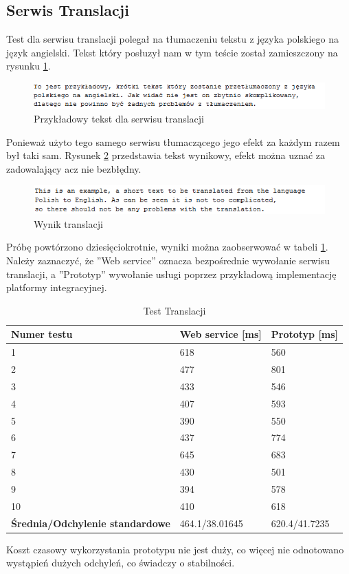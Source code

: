\subsection{Serwis Translacji}
Test dla serwisu translacji polegał na tłumaczeniu tekstu z języka polskiego na język angielski. Tekst który posłuzył nam w tym teście został zamieszczony na rysunku \ref{fig:translatorExample}.
\begin{figure}[!h]
\centering
\includegraphics[scale=0.9]{translatorExample.png}
\caption{Przykładowy tekst dla serwisu translacji}\label{fig:translatorExample}
\end{figure}
Ponieważ użyto tego samego serwisu tłumaczącego jego efekt za każdym razem był taki sam. Rysunek \ref{fig:translatorResult} przedstawia tekst wynikowy, efekt można uznać za zadowalający acz nie bezbłędny. 
\begin{figure}[!h]
\centering
\includegraphics[scale=0.9]{translatorResult.png}
\caption{Wynik translacji}\label{fig:translatorResult}
\end{figure}

Próbę powtórzono dziesięciokrotnie, wyniki można zaobserwować w tabeli \ref{tab:translacja}. Należy zaznaczyć, że ''Web service'' oznacza bezpośrednie wywołanie serwisu translacji, a ''Prototyp'' wywołanie usługi poprzez przykładową implementację platformy integracyjnej.
\begin{center}
	\begin{table}[h]
	\label{tab:translacja}
	\caption{Test Translacji}
	\centering
	\begin{tabular}{| l | l | l |}	
		\hline
		\textbf{Numer testu} & \textbf{Web service [ms]} & \textbf{Prototyp [ms]} \\ \hline
		1 & 618 & 560\\ \hline
		2 & 477 & 801\\ \hline
		3 & 433 & 546\\ \hline
		4 & 407 & 593\\ \hline
		5 & 390 & 550\\ \hline
		6 & 437 & 774\\ \hline
		7 & 645 & 683\\ \hline
		8 & 430 & 501\\ \hline
		9 & 394 & 578\\ \hline
		10 & 410 & 618\\ \hline
		\textbf{Średnia/Odchylenie standardowe} & 464.1/38.01645 & 620.4/41.7235\\ 
		\hline
	\end{tabular}
	\end{table}
\end{center}
Koszt czasowy wykorzystania prototypu nie jest duży, co więcej nie odnotowano wystąpień dużych odchyleń, co świadczy o stabilności.

